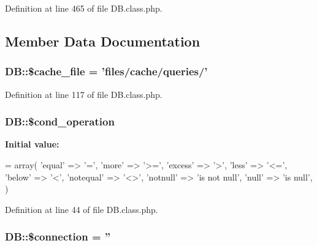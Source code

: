 Definition at line 465 of file D\-B.\-class.\-php.



\subsection{Member Data Documentation}
\hypertarget{classDB_a9952a27cbf07942e5bb8853ab95b5bdb}{
\subsubsection[{\$cache\-\_\-file}]{\setlength{\rightskip}{0pt plus 5cm}D\-B\-::\$cache\-\_\-file = 'files/cache/queries/'}}\label{classDB_a9952a27cbf07942e5bb8853ab95b5bdb}


Definition at line 117 of file D\-B.\-class.\-php.

\hypertarget{classDB_a85f8f65c37474b0e65d844e1f01f39b0}{
\subsubsection[{\$cond\-\_\-operation}]{\setlength{\rightskip}{0pt plus 5cm}D\-B\-::\$cond\-\_\-operation}}\label{classDB_a85f8f65c37474b0e65d844e1f01f39b0}
{\bfseries Initial value\-:}
\begin{DoxyCode}
= array(
        \textcolor{stringliteral}{'equal'} => \textcolor{charliteral}{'='},
        \textcolor{stringliteral}{'more'} => \textcolor{stringliteral}{'>='},
        \textcolor{stringliteral}{'excess'} => \textcolor{charliteral}{'>'},
        \textcolor{stringliteral}{'less'} => \textcolor{stringliteral}{'<='},
        \textcolor{stringliteral}{'below'} => \textcolor{charliteral}{'<'},
        \textcolor{stringliteral}{'notequal'} => \textcolor{stringliteral}{'<>'},
        \textcolor{stringliteral}{'notnull'} => \textcolor{stringliteral}{'is not null'},
        \textcolor{stringliteral}{'null'} => \textcolor{stringliteral}{'is null'},
    )
\end{DoxyCode}


Definition at line 44 of file D\-B.\-class.\-php.

\hypertarget{classDB_ac9071e31f8241ad644430537f39a16ce}{
\subsubsection[{\$connection}]{\setlength{\rightskip}{0pt plus 5cm}D\-B\-::\$connection = ''}}\label{classDB_ac9071e31f8241ad644430537f39a16ce}


